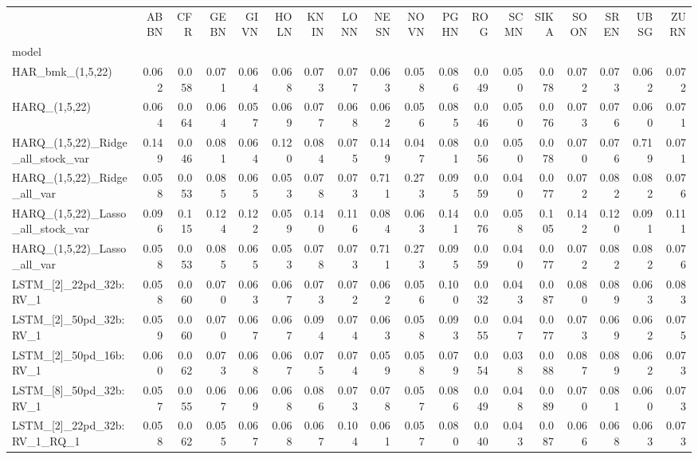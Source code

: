 \begin{tabular}{lrrrrrrrrrrrrrrrrr}
\toprule
 & ABBN & CFR & GEBN & GIVN & HOLN & KNIN & LONN & NESN & NOVN & PGHN & ROG & SCMN & SIKA & SOON & SREN & UBSG & ZURN \\
model &  &  &  &  &  &  &  &  &  &  &  &  &  &  &  &  &  \\
\midrule
HAR\_bmk\_(1,5,22) & 0.062 & 0.058 & 0.071 & 0.064 & 0.068 & 0.073 & 0.077 & 0.063 & 0.058 & 0.086 & 0.049 & 0.050 & 0.078 & 0.072 & 0.073 & 0.062 & 0.072 \\
HARQ\_(1,5,22) & 0.064 & 0.064 & 0.064 & 0.057 & 0.069 & 0.077 & 0.068 & 0.062 & 0.056 & 0.085 & 0.046 & 0.050 & 0.076 & 0.073 & 0.076 & 0.060 & 0.071 \\
HARQ\_(1,5,22)\_Ridge\_all\_stock\_var & 0.149 & 0.046 & 0.081 & 0.064 & 0.120 & 0.084 & 0.075 & 0.149 & 0.047 & 0.081 & 0.056 & 0.050 & 0.078 & 0.070 & 0.076 & 0.719 & 0.071 \\
HARQ\_(1,5,22)\_Ridge\_all\_var & 0.058 & 0.053 & 0.085 & 0.065 & 0.053 & 0.078 & 0.073 & 0.711 & 0.273 & 0.095 & 0.059 & 0.040 & 0.077 & 0.072 & 0.082 & 0.082 & 0.076 \\
HARQ\_(1,5,22)\_Lasso\_all\_stock\_var & 0.096 & 0.115 & 0.124 & 0.122 & 0.059 & 0.140 & 0.116 & 0.084 & 0.063 & 0.141 & 0.076 & 0.058 & 0.105 & 0.142 & 0.120 & 0.091 & 0.111 \\
HARQ\_(1,5,22)\_Lasso\_all\_var & 0.058 & 0.053 & 0.085 & 0.065 & 0.053 & 0.078 & 0.073 & 0.711 & 0.273 & 0.095 & 0.059 & 0.040 & 0.077 & 0.072 & 0.082 & 0.082 & 0.076 \\
LSTM\_[2]\_22pd\_32b:RV\_1 & 0.058 & 0.060 & 0.070 & 0.063 & 0.067 & 0.073 & 0.072 & 0.062 & 0.056 & 0.100 & 0.032 & 0.043 & 0.087 & 0.080 & 0.089 & 0.063 & 0.083 \\
LSTM\_[2]\_50pd\_32b:RV\_1 & 0.059 & 0.060 & 0.070 & 0.067 & 0.067 & 0.094 & 0.074 & 0.063 & 0.058 & 0.093 & 0.055 & 0.047 & 0.077 & 0.073 & 0.069 & 0.062 & 0.075 \\
LSTM\_[2]\_50pd\_16b:RV\_1 & 0.060 & 0.062 & 0.073 & 0.068 & 0.067 & 0.075 & 0.074 & 0.059 & 0.058 & 0.079 & 0.054 & 0.038 & 0.088 & 0.087 & 0.089 & 0.062 & 0.073 \\
LSTM\_[8]\_50pd\_32b:RV\_1 & 0.057 & 0.055 & 0.067 & 0.069 & 0.068 & 0.086 & 0.073 & 0.078 & 0.057 & 0.086 & 0.049 & 0.048 & 0.089 & 0.070 & 0.081 & 0.060 & 0.073 \\
LSTM\_[2]\_22pd\_32b:RV\_1\_RQ\_1 & 0.058 & 0.062 & 0.055 & 0.067 & 0.068 & 0.067 & 0.104 & 0.061 & 0.057 & 0.080 & 0.040 & 0.043 & 0.087 & 0.066 & 0.068 & 0.063 & 0.073 \\

\end{tabular}
